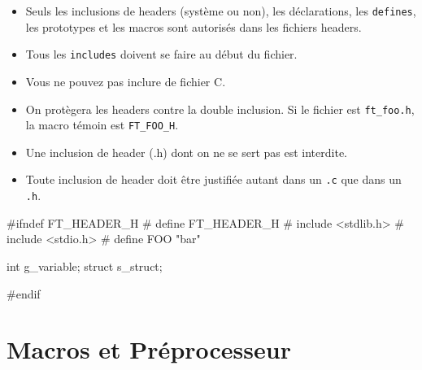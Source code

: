 \documentclass{42-fr}
\begin{document}
        \begin{itemize}

            \item Seuls les inclusions de headers (système ou non),
                les déclarations, les \texttt{defines}, les prototypes et les macros
                sont autorisés dans les fichiers headers.

            \item Tous les \texttt{includes} doivent se faire au début du fichier.

            \item Vous ne pouvez pas inclure de fichier C.

            \item On protègera les headers contre la double inclusion. Si le fichier est
            \texttt{ft\_foo.h}, la macro témoin est \texttt{FT\_FOO\_H}.

            \item Une inclusion de header (.h) dont on ne se sert pas est interdite.

            \item Toute inclusion de header doit être justifiée autant dans un \texttt{.c}
                que dans un \texttt{.h}.

        \end{itemize}

        \begin{42ccode}
#ifndef FT_HEADER_H
# define FT_HEADER_H
# include <stdlib.h>
# include <stdio.h>
# define FOO "bar"

int g_variable;
struct s_struct;

#endif
        \end{42ccode}
        \newpage

    \section{Macros et Préprocesseur}
\end{document}

